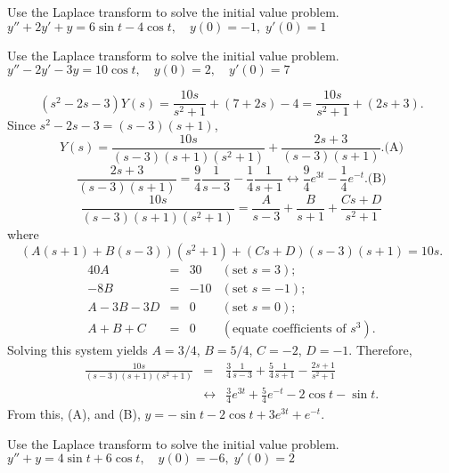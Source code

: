 \documentclass{ximera}
\begin{document}
\begin{problem}\label{exer:8.3.23} Use the Laplace transform to solve the initial value problem. $y''+2y'+y=6\sin t-4\cos t, \quad  y(0)=-1,\;
y'(0)=1$
\end{problem}

\begin{problem}\label{exer:8.3.24} Use the Laplace transform to solve the initial value problem. $y''-2y'-3y=10\cos t, \quad  y(0)=2,\quad y'(0)=7$

\begin{solution}
$$
(s^2-2s-3)Y(s)=\frac{10s}{s^2+1}+(7+2s)-4=
\frac{10s}{s^2+1}+(2s+3).
$$
Since $s^2-2s-3=(s-3)(s+1)$,
$$
Y(s)=
\frac{10s}{(s-3)(s+1)(s^2+1)}+\frac{2s+3}{(s-3)(s+1)}.
\text{(A)}
$$
$$
\frac{2s+3}{(s-3)(s+1)}=\frac{9}{4}\frac{1}{s-3}-\frac{1}{4}\frac{1}{s+1}
\leftrightarrow\frac{9}{4}e^{3t}-\frac{1}{4}e^{-t}.
\text{(B)}
$$
$$
\frac{10s}{(s-3)(s+1)(s^2+1)}=\frac{A}{s-3}+\frac{B}{s+1}+\frac{Cs+D}{s^2+1}
$$
 where
$$
(A(s+1)+B(s-3))(s^2+1)+(Cs+D)(s-3)(s+1)=10s.
$$
$$
\begin{array}{rcrl}
40A&=&30&(\mbox{set }s=3);\\
-8B&=&-10& (\mbox{set }s=-1);\\
A-3B-3D&=&0& (\mbox{set }s=0);\\
A+B+C&=&0&(\mbox{equate coefficients of }s^3).
\end{array}
$$
Solving this system yields $A=3/4$, $B=5/4$,
$C=-2$, $D=-1$. Therefore,
\begin{eqnarray*}
\frac{10s}{(s-3)(s+1)(s^2+1)}
&=&\frac{3}{4}\frac{1}{s-3}+\frac{5}{4}\frac{1}{s+1}-\frac{2s+1}{s^2+1}
\\&\leftrightarrow&
\frac{3}{4}e^{3t}+\frac{5}{4}e^{-t}-2\cos t-\sin t.
\end{eqnarray*}
From this, (A), and (B),
 $y=-\sin t-2\cos t+3e^{3t}+e^{-t}$.
\end{solution}
\end{problem}

\begin{problem}\label{exer:8.3.25} Use the Laplace transform to solve the initial value problem. $y''+y=4\sin t+6\cos t, \quad  y(0)=-6,\;
y'(0)=2$
\end{problem}
\end{document}
